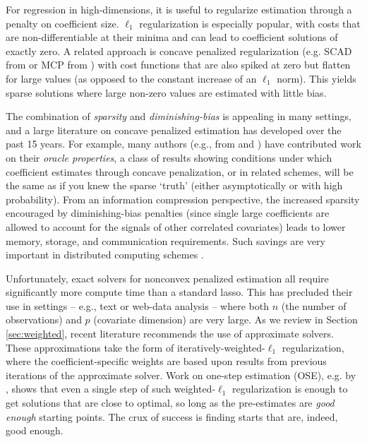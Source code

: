 \documentclass[12pt]{article}
\begin{document}
For regression in high-dimensions, it is useful to regularize estimation
through a penalty on coefficient size.   $\ell_1$  regularization \citep[i.e.,
the lasso of][]{tibshirani_regression_1996} is especially popular, with costs
that are non-differentiable at their minima and can lead to  coefficient
solutions of exactly zero.  A related approach is concave penalized
regularization (e.g. SCAD from \citealt{fan_variable_2001} or MCP from
\citealt{zhang_nearly_2010}) with cost functions that are also spiked at zero
but flatten for large values (as opposed to the constant increase of an $\ell_1$
norm).  This yields sparse solutions where  large non-zero values are estimated
with little bias. 

The combination of  \textit{sparsity} and \textit{diminishing-bias} 
 is appealing in many settings, and a large literature on concave
penalized estimation has developed over the past 15 years.  For example, many
authors (e.g., from \citealt{fan_variable_2001} and
\citealt{fan_nonconcave_2004})  have contributed work on their \textit{oracle
properties}, a class of results showing conditions under which coefficient
estimates through concave penalization, or in related schemes, will be the
same as if you knew the sparse `truth' (either asymptotically or with high
probability).   From an information compression perspective,  the increased
sparsity encouraged by diminishing-bias penalties (since single large
coefficients are allowed to account for the signals of other correlated
covariates) leads to lower memory, storage, and communication requirements.
Such savings are very important in distributed  computing schemes
\citep[e.g.,][]{taddy_distributed_2015}.


Unfortunately,  exact solvers for nonconvex penalized estimation  all require
significantly more compute time than a standard lasso.  This has precluded their use in settings -- e.g., text or web-data analysis
-- where both $n$ (the number of observations) and $p$ (covariate dimension)
   are very large. As we review in Section \ref{sec:weighted},  recent
   literature recommends the use of approximate solvers. These approximations
   take the form of iteratively-weighted-$\ell_1$ regularization, where the
   coefficient-specific weights are based upon results from previous
   iterations of the approximate solver.  Work on one-step estimation (OSE),
   e.g. by
   \cite{zou_one-step_2008}, shows that even a single step of such
   weighted-$\ell_1$ regularization is enough to get solutions that are close to
   optimal, so long as the pre-estimates are
\textit{good enough} starting points. 
The crux of success is  finding starts that are, indeed, good enough.
\end{document}
